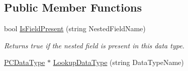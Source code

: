 \subsection*{Public Member Functions}
\begin{DoxyCompactItemize}
\item 
bool \hyperlink{classpc__emulator_1_1PCDataType_a490b62ae4fdf4428c2c7144157ca4a6e}{Is\+Field\+Present} (string Nested\+Field\+Name)\hypertarget{classpc__emulator_1_1PCDataType_a490b62ae4fdf4428c2c7144157ca4a6e}{}\label{classpc__emulator_1_1PCDataType_a490b62ae4fdf4428c2c7144157ca4a6e}

\begin{DoxyCompactList}\small\item\em Returns true if the nested field is present in this data type. \end{DoxyCompactList}\item 
\hyperlink{classpc__emulator_1_1PCDataType}{P\+C\+Data\+Type} $\ast$ \hyperlink{classpc__emulator_1_1PCDataType_abb9137e48eb04baa66ae797223d59782}{Lookup\+Data\+Type} (string Data\+Type\+Name)\hypertarget{classpc__emulator_1_1PCDataType_abb9137e48eb04baa66ae797223d59782}{}\label{classpc__emulator_1_1PCDataType_abb9137e48eb04baa66ae797223d59782}


\end{DoxyCompactItemize}
